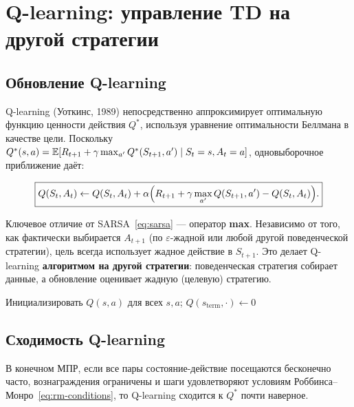 \section{Q-learning: управление TD на другой стратегии}
\label{sec:q-learning}

\subsection{Обновление Q-learning}

Q-learning (Уоткинс, 1989) непосредственно аппроксимирует оптимальную функцию ценности действия $Q^*$, используя уравнение оптимальности Беллмана в качестве цели.  Поскольку $Q^*(s,a) = \operatorname{\mathbb{E}}[R_{t+1}+\gamma\max_{a'}Q^*(S_{t+1},a') \mid S_t=s,A_t=a]$, одновыборочное приближение даёт:

\begin{equation}
\label{eq:q-learning}
\boxed{Q(S_t,A_t) \leftarrow Q(S_t,A_t) + \alpha\Bigl(R_{t+1} + \gamma\max_{a'} Q(S_{t+1},a') - Q(S_t,A_t)\Bigr).}
\end{equation}

Ключевое отличие от SARSA~\eqref{eq:sarsa} --- оператор \textbf{max}.  Независимо от того, как фактически выбирается $A_{t+1}$ (по $\varepsilon$-жадной или любой другой поведенческой стратегии), цель всегда использует жадное действие в $S_{t+1}$.  Это делает Q-learning \textbf{алгоритмом на другой стратегии}: поведенческая стратегия собирает данные, а обновление оценивает жадную (целевую) стратегию.

\begin{algorithm}[ht]
\caption{Q-learning (управление TD на другой стратегии)}
\label{alg:q-learning}
Инициализировать $Q(s,a)$ для всех $s,a$; $Q(s_{\mathrm{term}},\cdot)\leftarrow 0$\;
\end{algorithm}

\subsection{Сходимость Q-learning}

\begin{theorem}
\label{thm:q-learning-convergence}
В конечном МПР, если все пары состояние-действие посещаются бесконечно часто, вознаграждения ограничены и шаги удовлетворяют условиям Роббинса--Монро~\eqref{eq:rm-conditions}, то Q-learning сходится к $Q^*$ почти наверное.
\end{theorem}

